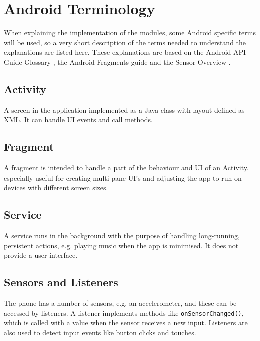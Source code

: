 \section{Android Terminology}
When explaining the implementation of the modules, some Android specific terms will be used, so a very short description of the terms needed to understand the explanations are listed here. These explanations are based on the Android API Guide Glossary \cite{android:terms}, the Android Fragments guide \cite{android:fragment} and the Sensor Overview \cite{android:sensor}.

\subsection*{Activity}
A screen in the application implemented as a Java class with layout defined as XML. It can handle UI events and call methods.

\subsection*{Fragment}
A fragment is intended to handle a part of the behaviour and UI of an Activity, especially useful for creating multi-pane UI's and adjusting the app to run on devices with different screen sizes.

\subsection*{Service}
A service runs in the background with the purpose of handling long-running, persistent actions, e.g. playing music when the app is minimised. It does not provide a user interface.

\subsection*{Sensors and Listeners}
The phone has a number of sensors, e.g. an accelerometer, and these can be accessed by listeners. A listener implements methods like \texttt{onSensorChanged()}, which is called with a value when the sensor receives a new input. Listeners are also used to detect input events like button clicks and touches.